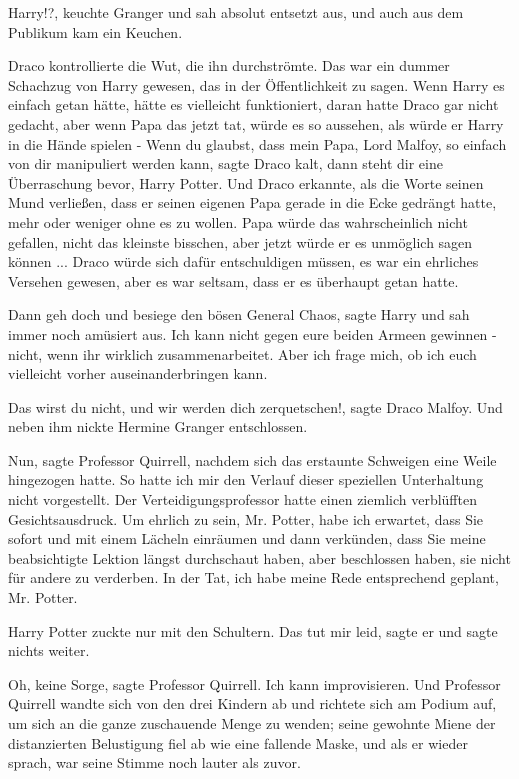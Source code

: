 \glqq{}Harry!?\grqq{}, keuchte Granger und sah absolut entsetzt aus, und auch aus
dem Publikum kam ein Keuchen.

Draco kontrollierte die Wut, die ihn durchströmte. Das war ein dummer Schachzug
von Harry gewesen, das in der Öffentlichkeit zu sagen. Wenn Harry es einfach
getan hätte, hätte es vielleicht funktioniert, daran hatte Draco gar nicht
gedacht, aber wenn Papa das jetzt tat, würde es so aussehen, als würde er Harry
in die Hände spielen - \glqq{}Wenn du glaubst, dass mein Papa, Lord Malfoy, so
einfach von dir manipuliert werden kann\grqq{}, sagte Draco kalt, \glqq{}dann
steht dir eine Überraschung bevor, Harry Potter.\grqq{} Und Draco erkannte, als die
Worte seinen Mund verließen, dass er seinen eigenen Papa gerade in die Ecke
gedrängt hatte, mehr oder weniger ohne es zu wollen. Papa würde das
wahrscheinlich nicht gefallen, nicht das kleinste bisschen, aber jetzt würde er
es unmöglich sagen können ... Draco würde sich dafür entschuldigen müssen, es war
ein ehrliches Versehen gewesen, aber es war seltsam, dass er es überhaupt getan
hatte.

\glqq{}Dann geh doch und besiege den bösen General Chaos\grqq{}, sagte Harry und
sah immer noch amüsiert aus. \glqq{}Ich kann nicht gegen eure beiden Armeen
gewinnen - nicht, wenn ihr wirklich zusammenarbeitet. Aber ich frage mich, ob
ich euch vielleicht vorher auseinanderbringen kann.\grqq{}

\glqq{}Das wirst du nicht, und wir werden dich zerquetschen!\grqq{}, sagte Draco
Malfoy. Und neben ihm nickte Hermine Granger entschlossen.

\glqq{}Nun\grqq{}, sagte Professor Quirrell, nachdem sich das erstaunte Schweigen
eine Weile hingezogen hatte. \glqq{}So hatte ich mir den Verlauf dieser
speziellen Unterhaltung nicht vorgestellt.\grqq{} Der Verteidigungsprofessor hatte
einen ziemlich verblüfften Gesichtsausdruck. \glqq{}Um ehrlich zu sein, Mr.
Potter, habe ich erwartet, dass Sie sofort und mit einem Lächeln einräumen und
dann verkünden, dass Sie meine beabsichtigte Lektion längst durchschaut haben,
aber beschlossen haben, sie nicht für andere zu verderben. In der Tat, ich habe
meine Rede entsprechend geplant, Mr. Potter.\grqq{}

Harry Potter zuckte nur mit den Schultern. \glqq{}Das tut mir leid\grqq{}, sagte
er und sagte nichts weiter.

\glqq{}Oh, keine Sorge\grqq{}, sagte Professor Quirrell. \glqq{}Ich kann
improvisieren.\grqq{} Und Professor Quirrell wandte sich von den drei Kindern ab und
richtete sich am Podium auf, um sich an die ganze zuschauende Menge zu wenden;
seine gewohnte Miene der distanzierten Belustigung fiel ab wie eine fallende
Maske, und als er wieder sprach, war seine Stimme noch lauter als zuvor.

